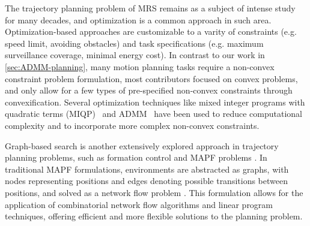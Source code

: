 \documentclass[10pt,twocolumn,twoside]{IEEEtran}
\begin{document}
\noindent{} The trajectory planning problem of MRS remains as a subject of intense study for many decades, and optimization is a common approach in such area. Optimization-based approaches are customizable to a varity of constraints (e.g. speed limit, avoiding obstacles) and task specifications (e.g. maximum surveillance coverage, minimal energy cost). In contrast to our work in \cref{sec:ADMM-planning}, many motion planning tasks require a non-convex constraint problem formulation, most contributors focused on convex problems, and only allow for a few types of pre-specified non-convex constraints through convexification\cite{liu2014solving}\cite{VanParys2016}\cite{Schulman2014}. Several optimization techniques like mixed integer programs with quadratic terms (MIQP)~\cite{mellinger2012mixed} and ADMM~\cite{bento2013message} have been used to reduce computational complexity and to incorporate more complex non-convex constraints.

Graph-based search is another extensively explored approach in trajectory planning problems, such as formation control \cite{tanner2004leader,hu2019distributed} and MAPF problems \cite{stern2019multi}. In traditional MAPF formulations, environments are abstracted as graphs, with nodes representing positions and edges denoting possible transitions between positions, and solved as a network flow problem \cite{yu2013multi,yu2016optimal}. This formulation allows for the application of combinatorial network flow algorithms and linear program techniques, offering efficient and more flexible solutions to the planning problem. %
\end{document}
